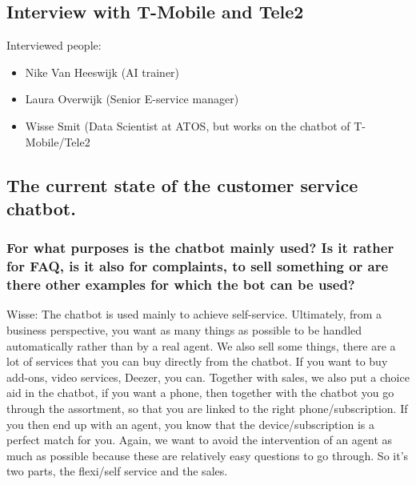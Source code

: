 \begin{appendices}
	\section{Interview with T-Mobile and Tele2}
	\label{in:T-Mobile}
	Interviewed people:
	\begin{itemize}
		\item Nike Van Heeswijk (AI trainer)
		\item Laura Overwijk (Senior E-service manager)
		\item Wisse Smit (Data Scientist at ATOS, but works on the chatbot of T-Mobile/Tele2
	\end{itemize}
	\subsection{The current state of the customer service chatbot.}
	\subsubsection{For what purposes is the chatbot mainly used? Is it rather for FAQ, is it
		also for complaints, to sell something or are there other examples for which
		the bot can be used?}
	Wisse: The chatbot is used mainly to achieve self-service. Ultimately, from a business perspective, you want as many things as possible to be handled automatically rather than by a real agent. We also sell some things, there are a lot of services that you can buy directly from the chatbot. If you want to buy add-ons, video services, Deezer, you can. Together with sales, we also put a choice aid in the chatbot, if you want a phone, then together with the chatbot you go through the assortment, so that you are linked to the right phone/subscription. If you then end up with an agent, you know that the device/subscription is a perfect match for you. Again, we want to avoid the intervention of an agent as much as possible because these are relatively easy questions to go through. So it's two parts, the flexi/self service and the sales.
	

\end{appendices}
